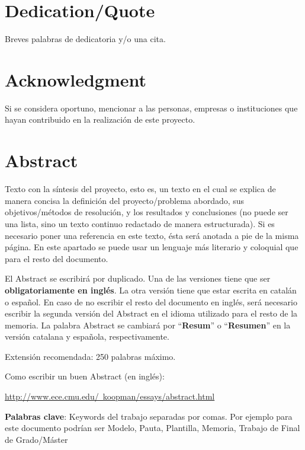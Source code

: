 \chapter*{Dedication/Quote}

Breves palabras de dedicatoria y/o una cita.

\chapter*{Acknowledgment}

Si se considera oportuno, mencionar a las personas, empresas o instituciones que hayan contribuido en la realización de este proyecto.

\chapter*{Abstract}

\onehalfspacing

Texto con la síntesis del proyecto, esto es, un texto en el cual se explica de manera concisa la definición del proyecto/problema abordado, sus objetivos/métodos de resolución, y los resultados y conclusiones (no puede ser una lista, sino un texto continuo redactado de manera estructurada). Si es necesario poner una referencia en este texto, ésta será anotada a pie de la misma página. En este apartado se puede usar un lenguaje más literario y coloquial que para el resto del documento.

El Abstract se escribirá por duplicado. Una de las versiones tiene que ser \textbf{obligatoriamente en inglés}. La otra versión tiene que estar escrita en catalán o español. En caso de no escribir el resto del documento en inglés, será necesario escribir la segunda versión del Abstract en el idioma utilizado para el resto de la memoria. La palabra Abstract se cambiará por ``\textbf{Resum}'' o ``\textbf{Resumen}'' en la versión catalana y española, respectivamente. 

Extensión recomendada: 250 palabras máximo.

Como escribir un buen Abstract (en inglés):

\href{http://www.ece.cmu.edu/~koopman/essays/abstract.html}{http://www.ece.cmu.edu/~koopman/essays/abstract.html}

\vspace{1.5cm}

\textbf{Palabras clave}: Keywords del trabajo separadas por comas. Por ejemplo para este documento podrían ser Modelo, Pauta, Plantilla, Memoria, Trabajo de Final de Grado/Máster